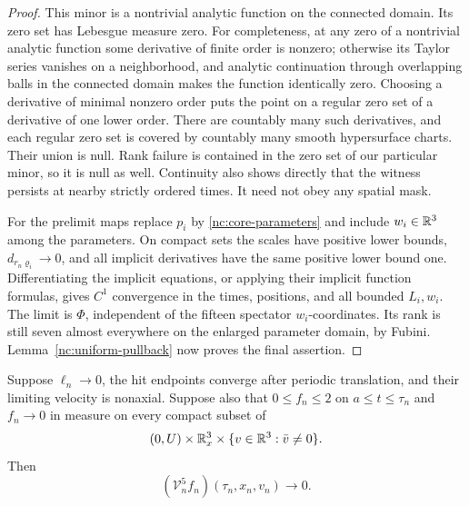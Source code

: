 \begin{proof}
This minor is a nontrivial analytic function on the connected
domain.  Its zero set has Lebesgue measure zero.  For completeness,
at any zero of a nontrivial analytic function some derivative of
finite order is nonzero; otherwise its Taylor series vanishes on
a neighborhood, and analytic continuation through overlapping
balls in the connected domain makes the function identically
zero.  Choosing a derivative of minimal nonzero order puts the
point on a regular zero set of a derivative of one lower order.
There are countably many such derivatives, and each regular zero
set is covered by countably many smooth hypersurface charts.
Their union is null.  Rank failure is contained in the zero set
of our particular minor, so it is null as well.  Continuity also
shows directly that the witness persists at nearby strictly
ordered times.  It need not obey any spatial mask.

For the prelimit maps replace \(p_i\) by
\eqref{nc:core-parameters} and include \(w_i\in\mathbb R^3\) among
the parameters.  On compact sets the scales have positive lower
bounds, \(d_{r_n\varrho_i}\to0\), and all implicit derivatives have
the same positive lower bound one.  Differentiating the implicit
equations, or applying their implicit function formulas, gives
\(C^1\) convergence in the times, positions, and all bounded
\(L_i,w_i\).  The limit is \(\Phi\), independent of the fifteen
spectator \(w_i\)-coordinates.  Its rank is still seven almost
everywhere on the enlarged parameter domain, by Fubini.
Lemma~\ref{nc:uniform-pullback} now proves the final assertion.
\end{proof}

\begin{lemma}
\label{nc:five-nonaxial-gains}
Suppose \(\ell_n\to0\), the hit endpoints converge after periodic
translation, and their limiting velocity is nonaxial.  Suppose
also that \(0\le f_n\le2\) on \(a\le t\le\tau_n\) and
\(f_n\to0\) in measure on every compact subset of
\[
 (0,U)\times\mathbb R^3_x
       \times\{v\in\mathbb R^3:\bar v\ne0\}.
\]
Then
\[
 (\mathcal V_n^5f_n)(\tau_n,x_n,v_n)\longrightarrow0.
\]
\end{lemma}

